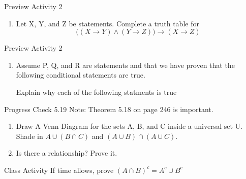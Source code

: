 \documentclass{beamer}
\newcounter{saveenumi}
\newcommand{\seti}{\setcounter{saveenumi}{\value{enumi}}}
\newcommand{\conti}{\setcounter{enumi}{\value{saveenumi}}}
\begin{document}
\begin{frame}[t]{Preview Activity 2}
    \begin{enumerate}
        \item Let X, Y, and Z be statements.  Complete a truth table for
        \[\Big((X \to Y) \wedge (Y \to Z) \Big) \to (X \to Z)\]
        \seti
    \end{enumerate}
\end{frame}

\begin{frame}[t]{Preview Activity 2}
    \begin{enumerate}
        \conti
        \item Assume P, Q, and R are statements and that we have proven that the following conditional statements are true.
        \begin{itemize}
        \end{itemize}
        Explain why each of the following statments is true
        \begin{enumerate}
        \end{enumerate}
    \end{enumerate}
\end{frame}

\begin{frame}[t]{Progress Check 5.19}
    Note: Theorem 5.18 on page 246 is important.
\begin{enumerate}
    \item Draw A Venn Diagram for the sets A, B, and C inside a universal set U.  Shade in $A \cup (B \cap C)$ and $(A \cup B) \cap (A \cup C)$.
    \item Is there a relationship?  Prove it.
\end{enumerate}
\end{frame}

\begin{frame}[t]{Class Activity}
    If time allows, prove $(A \cap B)^c = A^c \cup B^c$
\end{frame}
\end{document}

